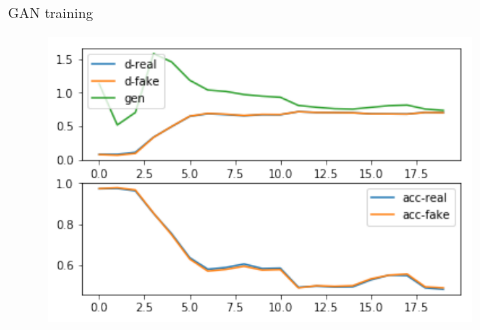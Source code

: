 \documentclass[15pt]{beamer} %
\begin{document}
\begin{frame}{GAN training}
  \begin{figure}
   \centering
   \includegraphics[width=.6\textwidth]{gan_training}
  \end{figure}
\end{frame}
\end{document}
